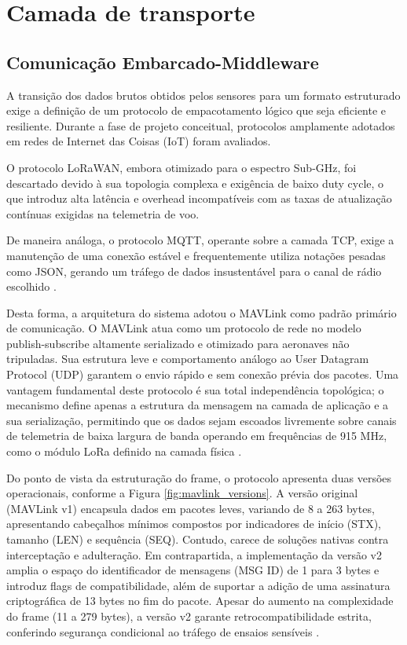 \section{Camada de transporte}
\subsection{Comunicação Embarcado-Middleware}
A transição dos dados brutos obtidos pelos sensores para um formato estruturado exige a definição de um protocolo de empacotamento lógico que seja eficiente e resiliente. Durante a fase de projeto conceitual, protocolos amplamente adotados em redes de Internet das Coisas (IoT) foram avaliados. 

O protocolo LoRaWAN, embora otimizado para o espectro Sub-GHz, foi descartado devido à sua topologia complexa e exigência de baixo duty cycle, o que introduz alta latência e overhead incompatíveis com as taxas de atualização contínuas exigidas na telemetria de voo. 

De maneira análoga, o protocolo MQTT, operante sobre a camada TCP, exige a manutenção de uma conexão estável e frequentemente utiliza notações pesadas como JSON, gerando um tráfego de dados insustentável para o canal de rádio escolhido \cite{oasis2019mqtt}.

Desta forma, a arquitetura do sistema adotou o MAVLink como padrão primário de comunicação. O MAVLink atua como um protocolo de rede no modelo publish-subscribe altamente serializado e otimizado para aeronaves não tripuladas. Sua estrutura leve e comportamento análogo ao User Datagram Protocol (UDP) garantem o envio rápido e sem conexão prévia dos pacotes. Uma vantagem fundamental deste protocolo é sua total independência topológica; o mecanismo define apenas a estrutura da mensagem na camada de aplicação e a sua serialização, permitindo que os dados sejam escoados livremente sobre canais de telemetria de baixa largura de banda operando em frequências de 915 MHz, como o módulo LoRa definido na camada física \cite{mavlink_dev_guide}.

Do ponto de vista da estruturação do frame, o protocolo apresenta duas versões operacionais, conforme a Figura \ref{fig:mavlink_versions}. A versão original (MAVLink v1) encapsula dados em pacotes leves, variando de 8 a 263 bytes, apresentando cabeçalhos mínimos compostos por indicadores de início (STX), tamanho (LEN) e sequência (SEQ). Contudo, carece de soluções nativas contra interceptação e adulteração. Em contrapartida, a implementação da versão v2 amplia o espaço do identificador de mensagens (MSG ID) de 1 para 3 bytes e introduz flags de compatibilidade, além de suportar a adição de uma assinatura criptográfica de 13 bytes no fim do pacote. Apesar do aumento na complexidade do frame (11 a 279 bytes), a versão v2 garante retrocompatibilidade estrita, conferindo segurança condicional ao tráfego de ensaios sensíveis \cite{mavlink_dev_guide}.


